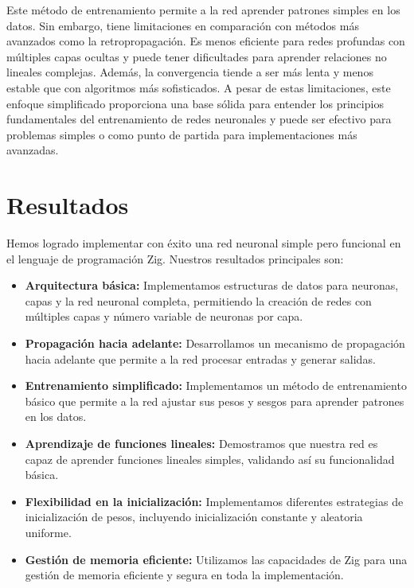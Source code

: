 \documentclass[twocolumn]{article}
\begin{document}
Este método de entrenamiento permite a la red aprender patrones simples en los datos. Sin embargo, tiene limitaciones en comparación con métodos más avanzados como la retropropagación. Es menos eficiente para redes profundas con múltiples capas ocultas y puede tener dificultades para aprender relaciones no lineales complejas. Además, la convergencia tiende a ser más lenta y menos estable que con algoritmos más sofisticados. A pesar de estas limitaciones, este enfoque simplificado proporciona una base sólida para entender los principios fundamentales del entrenamiento de redes neuronales y puede ser efectivo para problemas simples o como punto de partida para implementaciones más avanzadas.

\section{Resultados}
Hemos logrado implementar con éxito una red neuronal simple pero funcional en el lenguaje de programación Zig. Nuestros resultados principales son:

\begin{itemize}
    \item \textbf{Arquitectura básica:} Implementamos estructuras de datos para neuronas, capas y la red neuronal completa, permitiendo la creación de redes con múltiples capas y número variable de neuronas por capa.

    \item \textbf{Propagación hacia adelante:} Desarrollamos un mecanismo de propagación hacia adelante que permite a la red procesar entradas y generar salidas.

    \item \textbf{Entrenamiento simplificado:} Implementamos un método de entrenamiento básico que permite a la red ajustar sus pesos y sesgos para aprender patrones en los datos.

    \item \textbf{Aprendizaje de funciones lineales:} Demostramos que nuestra red es capaz de aprender funciones lineales simples, validando así su funcionalidad básica.

    \item \textbf{Flexibilidad en la inicialización:} Implementamos diferentes estrategias de inicialización de pesos, incluyendo inicialización constante y aleatoria uniforme.

    \item \textbf{Gestión de memoria eficiente:} Utilizamos las capacidades de Zig para una gestión de memoria eficiente y segura en toda la implementación.
\end{itemize}
\end{document}

